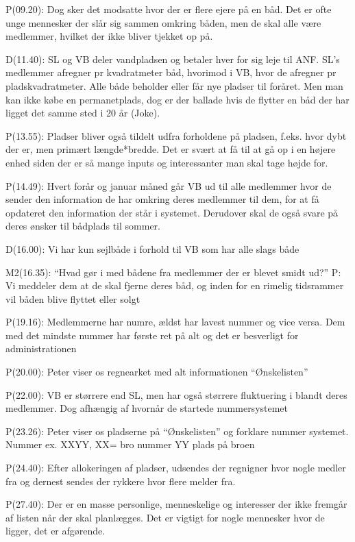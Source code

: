 P(09.20): Dog sker det modsatte hvor der er flere ejere på en båd. Det er ofte unge mennesker der slår sig sammen omkring båden, men de skal alle være medlemmer, hvilket der ikke bliver tjekket op på.

D(11.40): SL og VB deler vandpladsen og betaler hver for sig leje til ANF. SL's medlemmer afregner pr kvadratmeter båd, hvorimod i VB, hvor de afregner pr pladskvadratmeter. Alle både beholder eller får nye pladser til foråret. Men man kan ikke købe en permanetplads, dog er der ballade hvis de flytter en båd der har ligget det samme sted i 20 år (Joke).

P(13.55): Pladser bliver også tildelt udfra forholdene på pladsen, f.eks. hvor dybt der er, men primært længde*bredde. Det er svært at få til at gå op i en højere enhed siden der er så mange inputs og interessanter man skal tage højde for.

P(14.49): Hvert forår og januar måned går VB ud til alle medlemmer hvor de sender den information de har omkring deres medlemmer til dem, for at få opdateret den information der står i systemet. Derudover skal de også svare på deres ønsker til bådplads til sommer. 

D(16.00): Vi har kun sejlbåde i forhold til VB som har alle slags både

M2(16.35): “Hvad gør i med bådene fra medlemmer der er blevet smidt ud?”
P: Vi meddeler dem at de skal fjerne deres båd, og inden for en rimelig tidsrammer vil båden blive flyttet eller solgt

P(19.16): Medlemmerne har numre, ældst har lavest nummer og vice versa. Dem med det mindste nummer har første ret på alt og det er besverligt for administrationen

P(20.00): Peter viser os regnearket med alt informationen “Ønskelisten”

P(22.00): VB er størrere end SL, men har også størrere fluktuering i blandt deres medlemmer. Dog afhængig af hvornår de startede nummersystemet

P(23.26): Peter viser os pladserne på “Ønskelisten” og forklare nummer systemet. Nummer ex. XXYY, XX= bro nummer YY plads på broen

P(24.40): Efter allokeringen af pladser, udsendes der regnigner hvor nogle medler fra og dernest sendes der rykkere hvor flere melder fra.

P(27.40): Der er en masse personlige, menneskelige og interesser der ikke fremgår af listen når der skal planlægges. Det er vigtigt for nogle mennesker hvor de ligger, det er afgørende.

